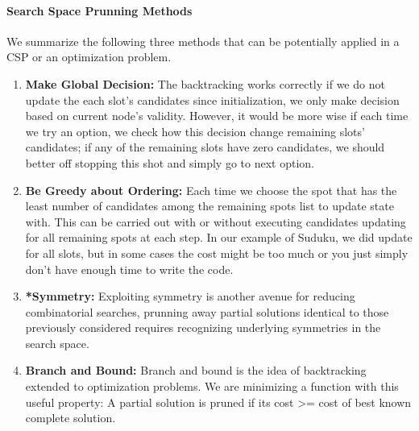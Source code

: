 \documentclass[../main.tex]{subfiles}
\begin{document}
\paragraph{Search Space Prunning Methods} We summarize the following three methods that can be potentially applied in a CSP or an optimization problem.  
\begin{enumerate}
     \item \textbf{Make Global Decision:} The backtracking works correctly if we do not update the each slot's candidates since initialization, we only make decision based on current node's validity. However, it would be more wise if each time we try an option, we check how this decision change remaining slots' candidates; if any of the remaining slots have zero candidates, we should better off stopping this shot and simply go to next option. 
    \item \textbf{Be Greedy about Ordering:} Each time we choose the spot that has the least number of candidates among the remaining spots list to update state with. This can be carried out with or without executing candidates updating for all remaining spots at each step. In our example of Suduku, we did update for all slots, but in some cases the cost might be too much or you just simply don't have enough time to write the code. 
    \item \textbf{*Symmetry:} Exploiting symmetry is another avenue for reducing combinatorial searches, prunning away partial solutions identical to those previously considered requires recognizing underlying symmetries in the search space. 
    \item \textbf{Branch and Bound:} Branch and bound is the idea of backtracking extended to optimization problems. We are minimizing a function with this useful property: A partial solution is pruned if its cost >= cost of best known complete solution.
\end{enumerate}

 
 
\end{document}

